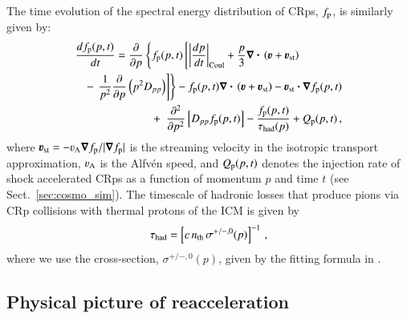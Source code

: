 \documentclass[fleqn,usenatbib,useAMS]{mnras}
\newcommand{\bcdot}{\ensuremath{%
  \mathchoice%
   {\mskip\thinmuskip\lower0.2ex\hbox{\scalebox{1.5}{$\cdot$}}\mskip\thinmuskip}}%
   {\mskip\thinmuskip\lower0.2ex\hbox{\scalebox{1.5}{$\cdot$}}\mskip\thinmuskip}%
   {\lower0.3ex\hbox{\scalebox{1.2}{$\cdot$}}}%
   {\lower0.3ex\hbox{\scalebox{1.2}{$\cdot$}}}%
}
\newcommand{\bvel}{\ensuremath{\boldsymbol{\varv}}}
\newcommand{\bnabla}{\ensuremath{\boldsymbol{\nabla}}}
\begin{document}
The time evolution of the spectral energy distribution of CRps,
$f_{{\mathrm{p}}}$, is similarly given by:
\begin{eqnarray}
\lefteqn{
  {{d f_{\rmn{p}}(p,t)}\over{d t}} =
  {{\partial }\over{\partial p}}
  \left\{
  f_{\rmn{p}}(p,t)\left[ \left|{{dp}\over{dt}}\right|_{\rm Coul}
    + \frac{p}{3}\bnabla\bcdot \left(\bvel+\bvel_{\rmn{st}}\right)\right.\right.}
\nonumber\\
&&-\left.\left. {1\over{p^2}}{{\partial }\over{\partial p}}\left(p^2 D_{pp}\right)
\right]\right\} - f_{\rmn{p}}(p,t) \bnabla\bcdot \left(\bvel+\bvel_{\rmn{st}}\right) 
- \bvel_{\rmn{st}}\bcdot\bnabla f_{\rmn{p}}(p,t)
\nonumber\\
&&+\,\,\, {{\partial^2 }\over{\partial p^2}}
\left[ D_{pp} f_{\rmn{p}}(p,t) \right] - {{f_{\rmn{p}}(p,t)}\over{\tau_{\rm had}(p)}}
+ Q_{\rmn{p}}(p,t)\, ,
\label{eq:FP_p}
\end{eqnarray}
where $\bvel_{\rmn{st}}=-\varv_{\rmn{A}}\bnabla f_{\rmn{p}}/|\bnabla
f_{\rmn{p}}|$ is the streaming velocity in the isotropic transport
approximation, $\varv_{\rmn{A}}$ is the Alfv\'en speed,
and $Q_{{\mathrm{p}}}(p,t)$ denotes the injection rate of shock accelerated
CRps as a function of momentum $p$ and time $t$ (see
Sect.~\ref{sec:cosmo_sim}). The timescale of
hadronic losses that produce pions via CRp collisions with thermal
protons of the ICM is given by 
\begin{eqnarray}
  \tau_{\rm had} = \left[c\,n_{\mathrm{th}}\,\sigma^{+/-,0}(p)\right]^{-1}\,,
\end{eqnarray}
where we use the cross-section, $\sigma^{+/-,0}(p)$, given by the
fitting formula in \citep{1986ApJ...307...47D}.

\subsection{Physical picture of reacceleration}
\label{sec:dummy} 
\end{document}
